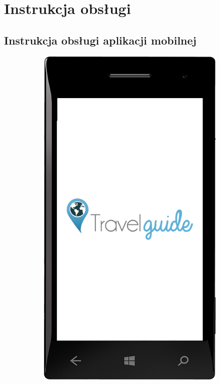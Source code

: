 \documentclass{book}
\begin{document}
	
		\section{Instrukcja obsługi}
		\subsection{Instrukcja obsługi aplikacji mobilnej}
		
				\begin{figure}[H]
					
					\begin{subfigure}{0.3\textwidth}
						\includegraphics[width=\textwidth]{screenshots/mobile/mobile1.png}					

\end{subfigure}
\end{figure}
\end{document}
